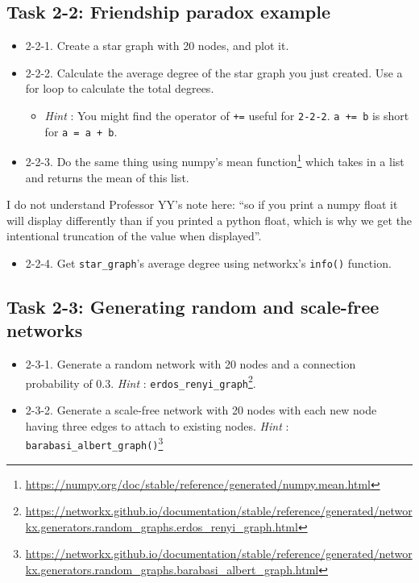 \documentclass[
]{krantz}
\makeatletter
\providecommand{\tightlist}{%
  \setlength{\itemsep}{0pt}\setlength{\parskip}{0pt}}
\renewcommand{\href}[2]{#2\footnote{\url{#1}}}
\newenvironment{kframe}{%
\medskip{}
\setlength{\fboxsep}{.8em}
 \def\at@end@of@kframe{}%
 \ifinner\ifhmode%
  \def\at@end@of@kframe{\end{minipage}}%
  \begin{minipage}{\columnwidth}%
 \fi\fi%
 \def\FrameCommand##1{\hskip\@totalleftmargin \hskip-\fboxsep
 \colorbox{shadecolor}{##1}\hskip-\fboxsep
     \hskip-\linewidth \hskip-\@totalleftmargin \hskip\columnwidth}%
 \MakeFramed {\advance\hsize-\width
   \@totalleftmargin\z@ \linewidth\hsize
   \@setminipage}}%
 {\par\unskip\endMakeFramed%
 \at@end@of@kframe}
\newenvironment{rmdblock}[1]
  {
  \begin{itemize}
  \renewcommand{\labelitemi}{
    \raisebox{-.7\height}[0pt][0pt]{
      {\setkeys{Gin}{width=3em,keepaspectratio}\texttt{[image: images/\#1]}}
    }
  }
  \setlength{\fboxsep}{1em}
  \begin{kframe}
  \item
  }
  {
  \end{kframe}
  \end{itemize}
  }
\newenvironment{rmdreminder}
  {\begin{rmdblock}{reminder}}
  {\end{rmdblock}}
\makeatother
\begin{document}
\hypertarget{task-2-2-friendship-paradox-example}{%
\subsection{Task 2-2: Friendship paradox example}\label{task-2-2-friendship-paradox-example}}

\begin{itemize}
\item
  2-2-1. Create a star graph with 20 nodes, and plot it.
\item
  2-2-2. Calculate the average degree of the star graph you just created. Use a for loop to calculate the total degrees.

  \begin{itemize}
  \tightlist
  \item
    \emph{Hint} : You might find the operator of \texttt{+=} useful for \texttt{2-2-2}. \texttt{a\ +=\ b} is short for \texttt{a\ =\ a\ +\ b}.
  \end{itemize}
\item
  2-2-3. Do the same thing using \href{https://numpy.org/doc/stable/reference/generated/numpy.mean.html}{numpy's mean function} which takes in a list and returns the mean of this list.
\end{itemize}

\begin{rmdreminder}
I do not understand Professor YY's note here: ``so if you print a numpy float it will display differently than if you printed a python float, which is why we get the intentional truncation of the value when displayed''.
\end{rmdreminder}

\begin{itemize}
\tightlist
\item
  2-2-4. Get \texttt{star\_graph}'s average degree using networkx's \texttt{info()} function.
\end{itemize}

\hypertarget{task-2-3-generating-random-and-scale-free-networks}{%
\subsection{Task 2-3: Generating random and scale-free networks}\label{task-2-3-generating-random-and-scale-free-networks}}

\begin{itemize}
\item
  2-3-1. Generate a random network with 20 nodes and a connection probability of 0.3. \emph{Hint} : \href{https://networkx.github.io/documentation/stable/reference/generated/networkx.generators.random_graphs.erdos_renyi_graph.html}{\texttt{erdos\_renyi\_graph}}.
\item
  2-3-2. Generate a scale-free network with 20 nodes with each new node having three edges to attach to existing nodes. \emph{Hint} : \href{https://networkx.github.io/documentation/stable/reference/generated/networkx.generators.random_graphs.barabasi_albert_graph.html}{\texttt{barabasi\_albert\_graph()}}
\end{itemize}
\end{document}
